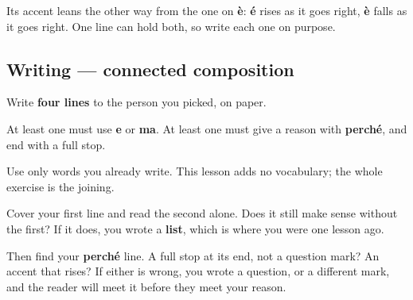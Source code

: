 Its accent leans the other way from the one on \textbf{è}: \textbf{é} rises as it goes right, \textbf{è} falls as it goes right. One line can hold both, so write each one on purpose.

\subsection*{Writing — connected composition}
Write \textbf{four lines} to the person you picked, on paper.

At least one must use \textbf{e} or \textbf{ma}. At least one must give a reason with \textbf{perché}, and end with a full stop.

Use only words you already write. This lesson adds no vocabulary; the whole exercise is the joining.

\begin{tcolorbox}[breakable,colback=teal!4,colframe=teal!35!black,title={Before you move on}]
Cover your first line and read the second alone. Does it still make sense without the first? If it does, you wrote a \textbf{list}, which is where you were one lesson ago.

Then find your \textbf{perché} line. A full stop at its end, not a question mark? An accent that rises? If either is wrong, you wrote a question, or a different mark, and the reader will meet it before they meet your reason.
\end{tcolorbox}
